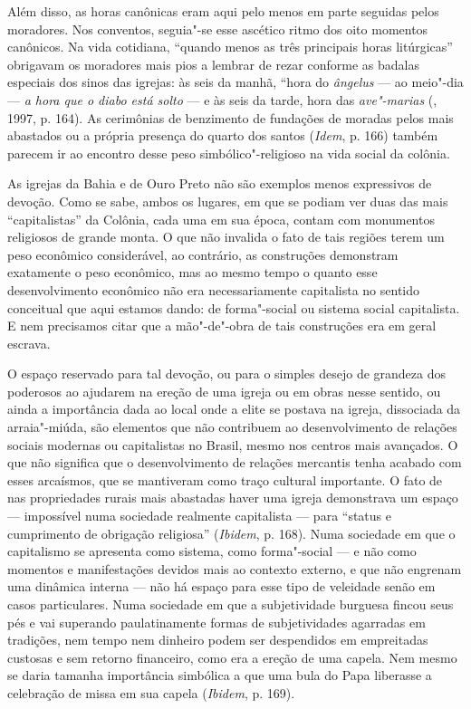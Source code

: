 Além disso, as horas canônicas eram aqui pelo menos em parte seguidas
pelos moradores. Nos conventos, seguia"-se esse ascético ritmo dos oito
momentos canônicos. Na vida cotidiana, ``quando menos as três principais
horas litúrgicas'' obrigavam os moradores mais pios a lembrar de rezar
conforme as badalas especiais dos sinos das igrejas: às seis da manhã,
``hora do \emph{ângelus} --- ao meio"-dia --- \emph{a hora que o
diabo está solto} --- e às seis da tarde, hora das \emph{ave"-marias}
(, 1997, p. 164). As cerimônias de benzimento de fundações de
moradas pelos mais abastados ou a própria presença do quarto dos santos
(\emph{Idem}, p. 166) também parecem ir ao encontro desse peso
simbólico"-religioso na vida social da colônia.

As igrejas da Bahia e de Ouro Preto não são exemplos menos expressivos
de devoção. Como se sabe, ambos os lugares, em que se podiam ver duas
das mais ``capitalistas'' da Colônia, cada uma em sua época, contam com
monumentos religiosos de grande monta. O que não invalida o fato de tais
regiões terem um peso econômico considerável, ao contrário, as
construções demonstram exatamente o peso econômico, mas ao mesmo tempo o
quanto esse desenvolvimento econômico não era necessariamente
capitalista no sentido conceitual que aqui estamos dando: de
forma"-social ou sistema social capitalista. E nem precisamos citar que a
mão"-de"-obra de tais construções era em geral escrava.

O espaço reservado para tal devoção, ou para o simples desejo de
grandeza dos poderosos ao ajudarem na ereção de uma igreja ou em obras
nesse sentido, ou ainda a importância dada ao local onde a elite se
postava na igreja, dissociada da arraia"-miúda, são elementos que não
contribuem ao desenvolvimento de relações sociais modernas ou
capitalistas no Brasil, mesmo nos centros mais avançados. O que não
significa que o desenvolvimento de relações mercantis tenha acabado com
esses arcaísmos, que se mantiveram como traço cultural importante. O fato de nas
propriedades rurais mais abastadas haver uma igreja demonstrava um
espaço --- impossível numa sociedade realmente capitalista --- para
``status e cumprimento de obrigação religiosa'' (\emph{Ibidem}, p. 168).
Numa sociedade em que o capitalismo se apresenta como sistema, como
forma"-social --- e não como momentos e manifestações devidos mais ao
contexto externo, e que não engrenam uma dinâmica interna --- não há
espaço para esse tipo de veleidade senão em casos particulares.
Numa sociedade em que a subjetividade burguesa fincou seus pés e vai superando
paulatinamente formas de subjetividades agarradas em tradições, nem tempo nem dinheiro
podem ser despendidos em empreitadas custosas e sem retorno financeiro,
como era a ereção de uma capela. Nem mesmo se daria tamanha importância
simbólica a que uma bula do Papa liberasse a celebração de missa em sua
capela (\emph{Ibidem}, p. 169).

